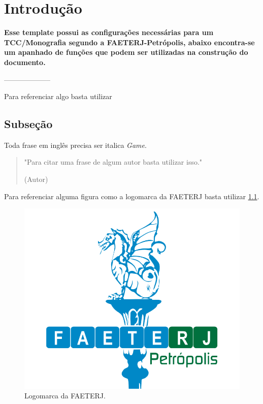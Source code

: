 \chapter{Introdução} %
\textbf{Esse template possui as configurações necessárias para um TCC/Monografia segundo a FAETERJ-Petrópolis, abaixo encontra-se um apanhado de funções que podem ser utilizadas na construção do documento.}


--------------------


Para referenciar algo basta utilizar \cite{unesco} %

\section{Subseção} %
Toda frase em inglês precisa ser italica \textit{Game}.



\begin{quote}
\small "Para citar uma frase de algum autor basta utilizar isso." 

(Autor)
\end{quote}



Para referenciar alguma figura como a logomarca da FAETERJ basta utilizar \ref{fig:faeterj}. %

\begin{figure}[!htb]
     \centering
     \includegraphics[scale=0.24]{imagens/faeterj.png}
     \caption{\small Logomarca da FAETERJ.}
     \label{fig:faeterj}
\end{figure}



